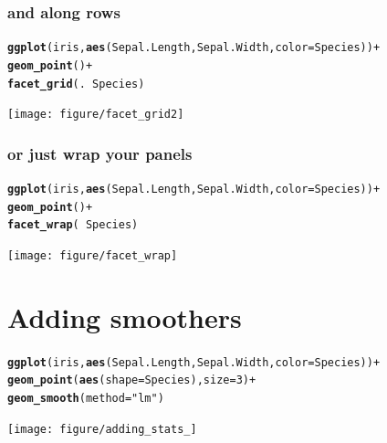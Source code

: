 \documentclass{beamer}\usepackage{graphicx, color}
\makeatletter
\newcommand{\hlfunctioncall}[1]{\textcolor[rgb]{0.501960784313725,0,0.329411764705882}{\textbf{#1}}}%
\newcommand{\hlstring}[1]{\textcolor[rgb]{0.6,0.6,1}{#1}}%
\newenvironment{kframe}{%
 \def\at@end@of@kframe{}%
 \ifinner\ifhmode%
  \def\at@end@of@kframe{\end{minipage}}%
  \begin{minipage}{\columnwidth}%
 \fi\fi%
 \def\FrameCommand##1{\hskip\@totalleftmargin \hskip-\fboxsep
 \colorbox{shadecolor}{##1}\hskip-\fboxsep
     \hskip-\linewidth \hskip-\@totalleftmargin \hskip\columnwidth}%
 \MakeFramed {\advance\hsize-\width
   \@totalleftmargin\z@ \linewidth\hsize
   \@setminipage}}%
 {\par\unskip\endMakeFramed%
 \at@end@of@kframe}
\newenvironment{knitrout}{}{} %
\makeatother
\begin{document}
\begin{frame}[fragile]
\frametitle{and along rows}
\begin{knitrout}\footnotesize
{}\color{fgcolor}\begin{kframe}
\begin{alltt}
\hlfunctioncall{ggplot}(iris, \hlfunctioncall{aes}(Sepal.Length, Sepal.Width, color = Species)) +
\hlfunctioncall{geom_point}() +
\hlfunctioncall{facet_grid}(. ~ Species)
\end{alltt}
\end{kframe}
\texttt{[image: figure/facet\_grid2]} 

\end{knitrout}

\end{frame}

\begin{frame}[fragile]
\frametitle{or just wrap your panels}
\begin{knitrout}\footnotesize
{}\color{fgcolor}\begin{kframe}
\begin{alltt}
\hlfunctioncall{ggplot}(iris, \hlfunctioncall{aes}(Sepal.Length, Sepal.Width, color = Species)) +
\hlfunctioncall{geom_point}() +
\hlfunctioncall{facet_wrap}( ~ Species)
\end{alltt}
\end{kframe}
\texttt{[image: figure/facet\_wrap]} 

\end{knitrout}

\end{frame}

\section*{Adding smoothers}
\frame{\sectionpage}


\begin{frame}[fragile]
\begin{knitrout}\footnotesize
{}\color{fgcolor}\begin{kframe}
\begin{alltt}
\hlfunctioncall{ggplot}(iris, \hlfunctioncall{aes}(Sepal.Length, Sepal.Width, color = Species)) +
\hlfunctioncall{geom_point}(\hlfunctioncall{aes}(shape = Species), size = 3) +
\hlfunctioncall{geom_smooth}(method = \hlstring{"lm"})
\end{alltt}
\end{kframe}
\texttt{[image: figure/adding\_stats\_]} 

\end{knitrout}

\end{frame}
\end{document}
